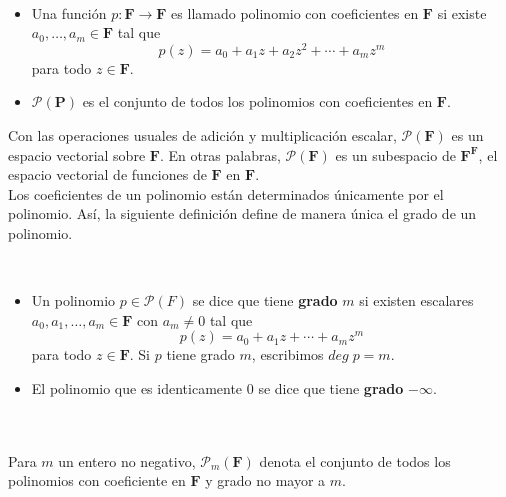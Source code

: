 \begin{mydef}\,\\
    \begin{itemize}
	\item Una función $p:\textbf{F}\to \textbf{F}$ es llamado polinomio con coeficientes en $\textbf{F}$ si existe $a_0,\ldots,a_m\in \textbf{F}$ tal que
	$$p(z)=a_0+a_1z+a_2z^2+\cdots + a_mz^m$$
	para todo $z\in \textbf{F}$.

	\item $\mathcal{P}(\textbf{P})$ es el conjunto de todos los polinomios con coeficientes en $\textbf{F}$.
    \end{itemize}
\end{mydef}

Con las operaciones usuales de adición y multiplicación escalar, $\mathcal{P}(\textbf{F})$ es un espacio vectorial sobre $\textbf{F}$. En otras palabras, $\mathcal{P}(\textbf{F})$ es un subespacio de $\textbf{F}^{\textbf{F}}$, el espacio vectorial de funciones de $\textbf{F}$ en $\textbf{F}$. \\

Los coeficientes de un polinomio están determinados únicamente por el polinomio. Así, la siguiente definición define de manera única el grado de un polinomio.

\begin{mydef}\,\\
    \begin{itemize}
	\item Un polinomio $p\in \mathcal{P}(F)$ se dice que tiene \textbf{grado} $m$ si existen escalares $a_0,a_1,\ldots,a_m\in \textbf{F}$ con $a_m\neq 0$ tal que
	$$p(z)=a_0+a_1z+\cdots+a_mz^m$$
	para todo $z\in \textbf{F}$. Si $p$ tiene grado $m$, escribimos $deg\; p=m$.
	\item El polinomio que es identicamente $0$ se dice que tiene \textbf{grado} $-\infty$.
    \end{itemize}
\end{mydef}

\begin{mydef}\;\\\\
    Para $m$ un entero no negativo, $\mathcal{P}_m(\textbf{F})$ denota el conjunto de todos los polinomios con coeficiente en $\textbf{F}$ y grado no mayor a $m$.
\end{mydef}


